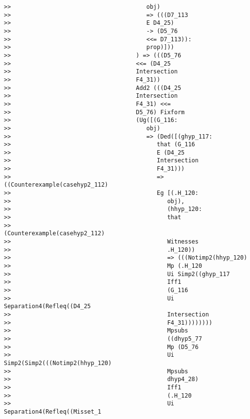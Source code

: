 \documentclass[12pt]{article}
\begin{document}
\begin{verbatim}
>>                                       obj)
>>                                       => (((D7_113
>>                                       E D4_25)
>>                                       -> (D5_76
>>                                       <<= D7_113)):
>>                                       prop)]))
>>                                    ) => (((D5_76
>>                                    <<= (D4_25
>>                                    Intersection
>>                                    F4_31))
>>                                    Add2 (((D4_25
>>                                    Intersection
>>                                    F4_31) <<=
>>                                    D5_76) Fixform
>>                                    (Ug([(G_116:
>>                                       obj)
>>                                       => (Ded([(ghyp_117:
>>                                          that (G_116
>>                                          E (D4_25
>>                                          Intersection
>>                                          F4_31)))
>>                                          => ((Counterexample(casehyp2_112)
>>                                          Eg [(.H_120:
>>                                             obj),
>>                                             (hhyp_120:
>>                                             that
>>                                             (Counterexample(casehyp2_112)
>>                                             Witnesses
>>                                             .H_120))
>>                                             => (((Notimp2(hhyp_120)
>>                                             Mp (.H_120
>>                                             Ui Simp2((ghyp_117
>>                                             Iff1
>>                                             (G_116
>>                                             Ui Separation4(Refleq((D4_25
>>                                             Intersection
>>                                             F4_31))))))))
>>                                             Mpsubs
>>                                             ((dhyp5_77
>>                                             Mp (D5_76
>>                                             Ui Simp2(Simp2(((Notimp2(hhyp_120)
>>                                             Mpsubs
>>                                             dhyp4_28)
>>                                             Iff1
>>                                             (.H_120
>>                                             Ui Separation4(Refleq((Misset_1

\end{verbatim}
\end{document}
